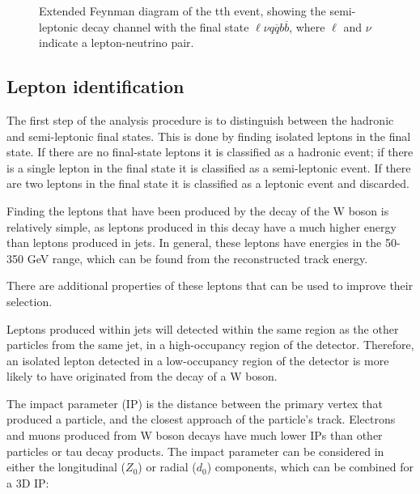 \begin{figure}
	\caption{Extended Feynman diagram of the tth event, showing the semi-leptonic decay channel  with the final state $\ell\nu q\overline{q}b\overline{b}$, where $\ell$ and $\nu$ indicate a lepton-neutrino pair.}
	\label{figure:physics/SM/feynman-tth-semileptonic}
\end{figure}

\subsection{Lepton identification}
The first step of the analysis procedure is to distinguish between the hadronic and semi-leptonic final states. This is done by finding isolated leptons in the final state. If there are no final-state leptons it is classified as a hadronic event; if there is a single lepton in the final state it is classified as a semi-leptonic event. If there are two leptons in the final state it is classified as a leptonic event and discarded.

Finding the leptons that have been produced by the decay of the W boson is relatively simple, as leptons produced in this decay have a much higher energy than leptons produced in jets. In general, these leptons have energies in the 50-350 GeV range, which can be found from the reconstructed track energy.

There are additional properties of these leptons that can be used to improve their selection.

Leptons produced within jets will detected within the same region as the other particles from the same jet, in a high-occupancy region of the detector. Therefore, an isolated lepton detected in a low-occupancy region of the detector is more likely to have originated from the decay of a W boson. 

The impact parameter (IP) is the distance between the primary vertex that produced a particle, and the closest approach of the particle's track. Electrons and muons produced from W boson decays have much lower IPs than other particles or tau decay products. The impact parameter can be considered in either the longitudinal ($Z_0$) or radial ($d_0$) components, which can be combined for a 3D IP:

